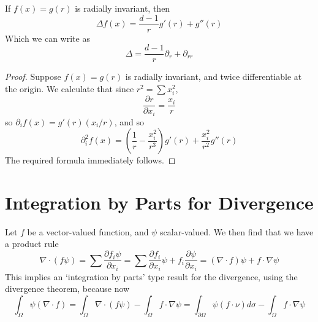 \begin{theorem}
    If $f(x) = g(r)$ is radially invariant, then
    \[ \Delta f(x) = \frac{d - 1}{r} g'(r) + g''(r) \]
    Which we can write as
    \[ \Delta = \frac{d-1}{r} \partial_r + \partial_{rr} \]
\end{theorem}
\begin{proof}
Suppose $f(x) = g(r)$ is radially invariant, and twice differentiable at the origin. We calculate that since $r^2 = \sum x_i^2$,
%
\[ \frac{\partial r}{\partial x_i} = \frac{x_i}{r} \]
%
so $\partial_i f(x) = g'(r) (x_i/r)$, and so
%
\[ \partial_i^2 f(x) = \left( \frac{1}{r} - \frac{x_i^2}{r^3} \right) g'(r) + \frac{x_i^2}{r^2} g''(r) \]
%
The required formula immediately follows.
\end{proof}

\section{Integration by Parts for Divergence}

Let $f$ be a vector-valued function, and $\psi$ scalar-valued. We then find that we have a product rule
%
\[ \nabla \cdot (f \psi) = \sum \frac{\partial f_i \psi}{\partial x_i} = \sum \frac{\partial f_i}{\partial x_i} \psi + f_i \frac{\partial \psi}{\partial x_i} = (\nabla \cdot f) \psi + f \cdot \nabla \psi \]
%
This implies an `integration by parts' type result for the divergence, using the divergence theorem, because now
%
\[ \int_\Omega \psi (\nabla \cdot f) = \int_\Omega \nabla \cdot (f \psi) - \int_\Omega f \cdot \nabla \psi = \int_{\partial \Omega} \psi(f \cdot \nu) d\sigma - \int_\Omega f \cdot \nabla \psi \]

